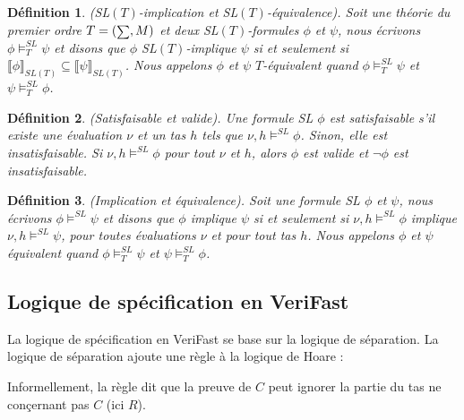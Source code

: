 \documentclass[11pt,openany]{article}
\newcommand{\verifast}{VeriFast}
\newcommand\phibra{\llbracket\phi\rrbracket}
\newcommand\psibra{\llbracket\psi\rrbracket}
\newcommand\smallsum{\mathsmaller\sum}
\newtheorem{definition}{D\'efinition}[subsection]
\begin{document}
\begin{definition}
(SL$(T)$-implication et SL$(T)$-\'equivalence). Soit une th\'eorie du premier ordre $T=(\smallsum,M)$ et deux SL$(T)$-formules $\phi$ et $\psi$, nous \'ecrivons $\phi\models^{SL}_{T}\psi$ et disons que $\phi$ SL$(T)$-implique $\psi$ si et seulement si $\phibra_{SL(T)}\subseteq\psibra_{SL(T)}$. Nous appelons $\phi$ et $\psi$ $T$-\'equivalent quand  $\phi\models^{SL}_{T}\psi$ et $\psi\models^{SL}_{T}\phi$. 
\end{definition}

\begin{definition}
(Satisfaisable et valide). Une formule SL $\phi$ est satisfaisable s'il existe une \'evaluation $\nu$ et un tas $h$ tels que $\nu,h\models^{SL}\phi$. Sinon, elle est \textit{insatisfaisable}. Si $\nu,h\models^{SL}\phi$ pour tout $\nu$ et $h$, alors $\phi$ est valide et $\neg\phi$ est insatisfaisable.
\end{definition}

\begin{definition}
(Implication et \'equivalence). Soit une formule SL $\phi$ et $\psi$, nous \'ecrivons $\phi\models^{SL}\psi$ et disons que $\phi$ implique $\psi$ si et seulement si $\nu,h\models^{SL}\phi$ implique $\nu,h\models^{SL}\psi$, pour toutes \'evaluations $\nu$ et pour tout tas $h$. Nous appelons $\phi$ et $\psi$ \'equivalent quand $\phi\models^{SL}_{T}\psi$ et $\psi\models^{SL}_{T}\phi$. 
\end{definition}
		
	\subsection{Logique de sp\'ecification en \verifast{}}
		La logique de sp\'ecification en \verifast{} se base sur la logique de s\'eparation. La logique de s\'eparation ajoute une r\`egle \`a la logique de Hoare :
		\begin{center}
		


		\end{center}
		Informellement, la r\`egle dit que la preuve de $C$ peut ignorer la partie du tas ne con\c{c}ernant pas $C$ (ici $R$).
		
\end{document}
